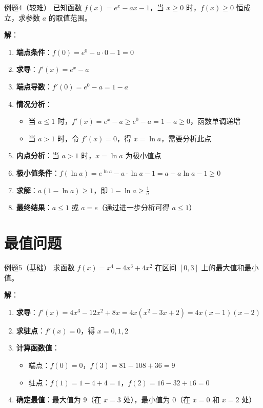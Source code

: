 \documentclass[a4paper,12pt]{ctexrep}
\begin{document}
\begin{examplebox}{例题4（较难）}
已知函数 $f(x) = e^x - ax - 1$，当 $x \geq 0$ 时，$f(x) \geq 0$ 恒成立，求参数 $a$ 的取值范围。

\textbf{解}：
\begin{enumerate}
    \item \textbf{端点条件}：$f(0) = e^0 - a \cdot 0 - 1 = 0$
    \item \textbf{求导}：$f'(x) = e^x - a$
    \item \textbf{端点导数}：$f'(0) = e^0 - a = 1 - a$
    \item \textbf{情况分析}：
    \begin{itemize}
        \item 当 $a \leq 1$ 时，$f'(x) = e^x - a \geq e^0 - a = 1 - a \geq 0$，函数单调递增
        \item 当 $a > 1$ 时，令 $f'(x) = 0$，得 $x = \ln a$，需要分析此点
    \end{itemize}
    \item \textbf{内点分析}：当 $a > 1$ 时，$x = \ln a$ 为极小值点
    \item \textbf{极小值条件}：$f(\ln a) = e^{\ln a} - a \cdot \ln a - 1 = a - a\ln a - 1 \geq 0$
    \item \textbf{求解}：$a(1 - \ln a) \geq 1$，即 $1 - \ln a \geq \frac{1}{a}$
    \item \textbf{最终结果}：$a \leq 1$ 或 $a = e$（通过进一步分析可得 $a \leq 1$）
\end{enumerate}
\end{examplebox}

\section{最值问题}

\begin{examplebox}{例题5（基础）}
求函数 $f(x) = x^4 - 4x^3 + 4x^2$ 在区间 $[0, 3]$ 上的最大值和最小值。

\textbf{解}：
\begin{enumerate}
    \item \textbf{求导}：$f'(x) = 4x^3 - 12x^2 + 8x = 4x(x^2 - 3x + 2) = 4x(x-1)(x-2)$
    \item \textbf{求驻点}：$f'(x) = 0$，得 $x = 0, 1, 2$
    \item \textbf{计算函数值}：
    \begin{itemize}
        \item 端点：$f(0) = 0$，$f(3) = 81 - 108 + 36 = 9$
        \item 驻点：$f(1) = 1 - 4 + 4 = 1$，$f(2) = 16 - 32 + 16 = 0$
    \end{itemize}
    \item \textbf{确定最值}：最大值为 $9$（在 $x = 3$ 处），最小值为 $0$（在 $x = 0$ 和 $x = 2$ 处）
\end{enumerate}
\end{examplebox}
\end{document}
